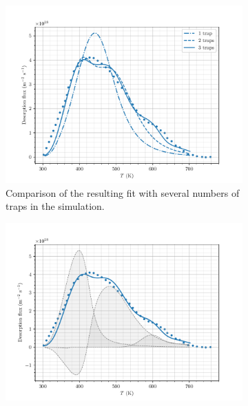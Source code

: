\begin{figure} [h!]
    \centering
        \begin{subfigure}[t]{0.5\linewidth}
            \centering
            \captionsetup{width=.9\linewidth}
            \includegraphics[width=\linewidth]{Figures/Chapter3/Parametric_optimisation/number_of_traps.pdf}
            \caption{Comparison of the resulting fit with several numbers of traps in the simulation.}
            \label{fig:number of traps comparison}
        \end{subfigure}%
        \begin{subfigure}[t]{0.5\linewidth}
            \centering
            \captionsetup{width=.9\linewidth}
            \includegraphics[width=\linewidth]{Figures/Chapter3/Parametric_optimisation/Ogorodnikova_5D.pdf}

\end{subfigure}
\end{figure}
